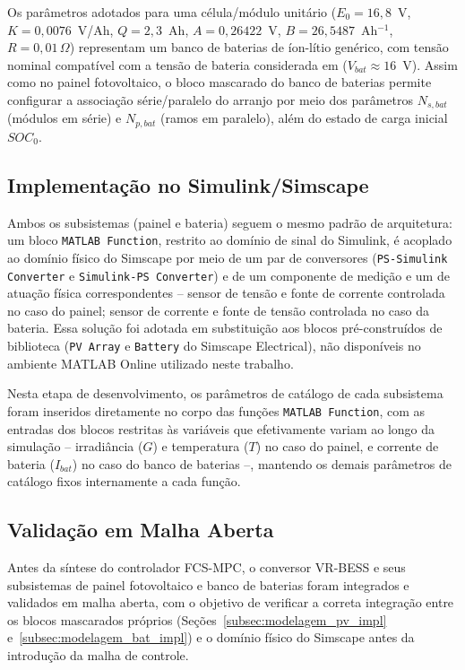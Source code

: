 Os parâmetros adotados para uma célula/módulo unitário
($E_0=16{,}8$~V, $K=0{,}0076$~V/Ah, $Q=2{,}3$~Ah, $A=0{,}26422$~V,
$B=26{,}5487$~Ah$^{-1}$, $R=0{,}01\,\Omega$) representam um banco de
baterias de íon-lítio genérico, com tensão nominal compatível com a tensão
de bateria considerada em \cite{srinivasa2016vrbess} ($V_{bat}\approx16$~V).
Assim como no painel fotovoltaico, o bloco mascarado do banco de baterias
permite configurar a associação série/paralelo do arranjo por meio dos
parâmetros $N_{s,bat}$ (módulos em série) e $N_{p,bat}$ (ramos em
paralelo), além do estado de carga inicial $SOC_0$.

\subsection{Implementação no Simulink/Simscape}
\label{subsec:implementacao}

Ambos os subsistemas (painel e bateria) seguem o mesmo padrão de
arquitetura: um bloco \texttt{MATLAB Function}, restrito ao domínio de
sinal do Simulink, é acoplado ao domínio físico do Simscape por meio de um
par de conversores (\texttt{PS-Simulink Converter} e
\texttt{Simulink-PS Converter}) e de um componente de medição e um de
atuação física correspondentes -- sensor de tensão e fonte de corrente
controlada no caso do painel; sensor de corrente e fonte de tensão
controlada no caso da bateria. Essa solução foi adotada em substituição aos
blocos pré-construídos de biblioteca (\texttt{PV Array} e \texttt{Battery}
do Simscape Electrical), não disponíveis no ambiente MATLAB Online
utilizado neste trabalho.

Nesta etapa de desenvolvimento, os parâmetros de catálogo de cada
subsistema foram inseridos diretamente no corpo das funções
\texttt{MATLAB Function}, com as entradas dos blocos restritas às
variáveis que efetivamente variam ao longo da simulação -- irradiância
($G$) e temperatura ($T$) no caso do painel, e corrente de bateria
($I_{bat}$) no caso do banco de baterias --, mantendo os demais parâmetros
de catálogo fixos internamente a cada função.

\subsection{Validação em Malha Aberta}
\label{subsec:validacao_ma}

Antes da síntese do controlador FCS-MPC, o conversor VR-BESS e seus
subsistemas de painel fotovoltaico e banco de baterias foram integrados e
validados em malha aberta, com o objetivo de verificar a correta
integração entre os blocos mascarados próprios (Seções~\ref{subsec:modelagem_pv_impl}
e~\ref{subsec:modelagem_bat_impl}) e o domínio físico do Simscape antes da
introdução da malha de controle.

